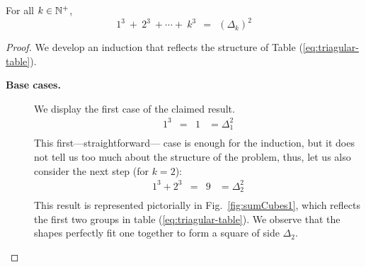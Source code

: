 \begin{prop}
\label{thm:cubes-sumto-Delta-saquared}
For all $k \in \mathbb{N}^+$,
\[ 1^3 \ + \ 2^3 \ + \cdots + \ k^3 \ \ = \ \ (\Delta_k)^2 \]
\end{prop}

\begin{proof}
We develop an induction that reflects the structure of Table (\ref{eq:triagular-table}).
\begin{description}
\item[{\bf Base cases.}]
We display the first case of the claimed result.
\[ \begin{array}{ccccc}
1^3                     & = & 1   & = {\displaystyle \Delta_1^2 } \\
\end{array}
\]
This first---straightforward--- case is enough for the induction, 
but it does not tell us too much about the structure of the problem, 
thus, let us also consider the next step (for $k=2$):
\[ \begin{array}{ccccc}
1^3 + 2^3           & = & 9   & = {\displaystyle \Delta_2^2} \\
\end{array}
\]
This result is represented pictorially in Fig.~\ref{fig:sumCubes1},
which reflects the first two groups in table (\ref{eq:triagular-table}).
We observe that the shapes perfectly fit one together to form a square of side $\Delta_2$.

\end{description}
\end{proof}
